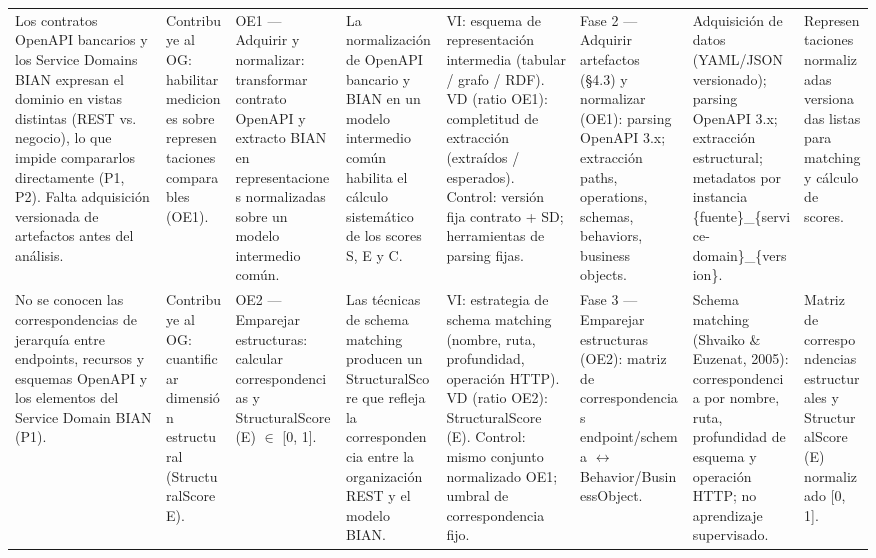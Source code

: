 \documentclass[10pt,landscape]{article}
\begin{document}
\begin{longtable}{@{} P{0.117\textwidth} P{0.117\textwidth} P{0.117\textwidth} P{0.117\textwidth} P{0.117\textwidth} P{0.117\textwidth} P{0.117\textwidth} P{0.117\textwidth} @{}}
 Los contratos OpenAPI bancarios y los Service Domains BIAN expresan el dominio en vistas distintas (REST vs. negocio), lo que impide compararlos directamente (P1, P2). Falta adquisición versionada de artefactos antes del análisis. & Contribuye al OG: habilitar mediciones sobre representaciones comparables (OE1). & OE1 — Adquirir y normalizar: transformar contrato OpenAPI y extracto BIAN en representaciones normalizadas sobre un modelo intermedio común. & La normalización de OpenAPI bancario y BIAN en un modelo intermedio común habilita el cálculo sistemático de los scores S, E y C. & VI: esquema de representación intermedia (tabular / grafo / RDF). VD (ratio OE1): completitud de extracción (extraídos / esperados). Control: versión fija contrato + SD; herramientas de parsing fijas. & Fase 2 — Adquirir artefactos (§4.3) y normalizar (OE1): parsing OpenAPI 3.x; extracción paths, operations, schemas, behaviors, business objects. & Adquisición de datos (YAML/JSON versionado); parsing OpenAPI 3.x; extracción estructural; metadatos por instancia \{fuente\}\_\{service-domain\}\_\{version\}. & Representaciones normalizadas versionadas listas para matching y cálculo de scores. \\
No se conocen las correspondencias de jerarquía entre endpoints, recursos y esquemas OpenAPI y los elementos del Service Domain BIAN (P1). & Contribuye al OG: cuantificar dimensión estructural (StructuralScore E). & OE2 — Emparejar estructuras: calcular correspondencias y StructuralScore (E) $\in$ [0, 1]. & Las técnicas de schema matching producen un StructuralScore que refleja la correspondencia entre la organización REST y el modelo BIAN. & VI: estrategia de schema matching (nombre, ruta, profundidad, operación HTTP). VD (ratio OE2): StructuralScore (E). Control: mismo conjunto normalizado OE1; umbral de correspondencia fijo. & Fase 3 — Emparejar estructuras (OE2): matriz de correspondencias endpoint/schema $\leftrightarrow$ Behavior/BusinessObject. & Schema matching (Shvaiko \& Euzenat, 2005): correspondencia por nombre, ruta, profundidad de esquema y operación HTTP; no aprendizaje supervisado. & Matriz de correspondencias estructurales y StructuralScore (E) normalizado [0, 1]. \\

\end{longtable}
\end{document}
